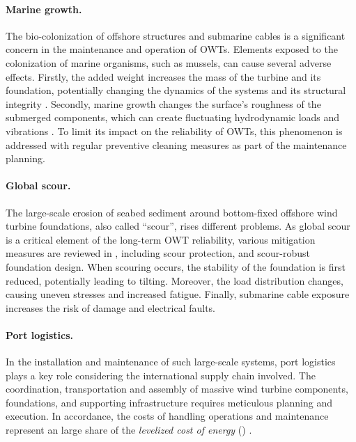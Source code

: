 

\paragraph{Marine growth.}
The bio-colonization of offshore structures and submarine cables is a significant concern in the maintenance and operation of OWTs. 
Elements exposed to the colonization of marine organisms, such as mussels, can cause several adverse effects. 
Firstly, the added weight increases the mass of the turbine and its foundation, potentially changing the dynamics of the systems and its structural integrity \citep{ameryoun_2019_marine_growth,schoefs_2022_reliability_marine_growth}. 
Secondly, marine growth changes the surface's roughness of the submerged components, which can create fluctuating hydrodynamic loads and vibrations \citep{marty_2021_cable_marine_growth}. 
To limit its impact on the reliability of OWTs, this phenomenon is addressed with regular preventive cleaning measures as part of the maintenance planning. 


\paragraph{Global scour.}
The large-scale erosion of seabed sediment around bottom-fixed offshore wind turbine foundations, also called ``scour'', rises different problems. 
As global scour is a critical element of the long-term OWT reliability, various mitigation measures are reviewed in \citet{fazeres_2021_scour}, including scour protection, and scour-robust foundation design.
When scouring occurs, the stability of the foundation is first reduced, potentially leading to tilting. 
Moreover, the load distribution changes, causing uneven stresses and increased fatigue. 
Finally, submarine cable exposure increases the risk of damage and electrical faults. 


\paragraph{Port logistics.}
In the installation and maintenance of such large-scale systems, port logistics plays a key role considering the international supply chain involved. 
The coordination, transportation and assembly of massive wind turbine components, foundations, and supporting infrastructure requires meticulous planning and execution. 
In accordance, the costs of handling operations and maintenance represent an large share of the \textit{levelized cost of energy} () \citep{shields_2021_owt_lcoe}.  

